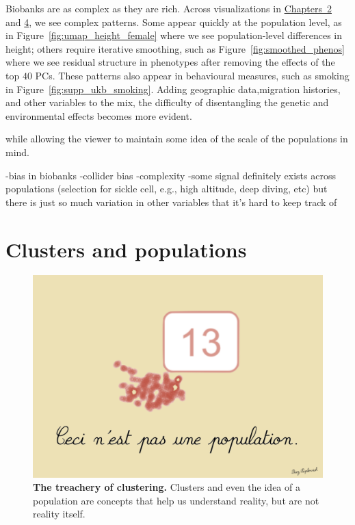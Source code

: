 Biobanks are as complex as they are rich. Across visualizations in \hyperref[chap:chapter2]{Chapters~2} and \hyperref[chap:chapter4]{4}, we see complex patterns. Some appear quickly at the population level, as in Figure~\ref{fig:umap_height_female} where we see population-level differences in height; others require iterative smoothing, such as  Figure~\ref{fig:smoothed_phenos} where we see residual structure in phenotypes after removing the effects of the top $40$ PCs. These patterns also appear in behavioural measures, such as smoking in Figure~\ref{fig:supp_ukb_smoking}. Adding geographic data,migration histories,  and other variables to the mix, the difficulty of disentangling the genetic and environmental effects becomes more evident.





 while allowing the viewer to maintain some idea of the scale of the populations in mind. 

-bias in biobanks
-collider bias
-complexity
-some signal definitely exists across populations (selection for sickle cell, e.g., high altitude, deep diving, etc) but there is just so much variation in other variables that it's hard to keep track of

\clearpage

\section{Clusters and populations}

\begin{figure}[h]
\centering
    \includegraphics[width=0.75\linewidth]{main_figures/discussion/magritte.png}
\caption[The treachery of clustering]{\textbf{The treachery of clustering.} Clusters and even the idea of a population are concepts that help us understand reality, but are not reality itself.}
\label{fig:magritte}
\end{figure}

